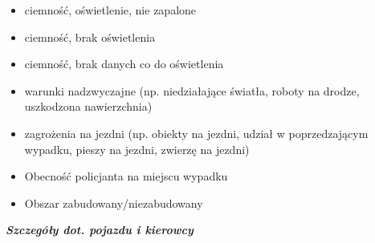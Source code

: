 \begin{itemize}
\item
  ciemność, oświetlenie, nie zapalone\\
\item
  ciemność, brak oświetlenia\\
\item
  ciemność, brak danych co do oświetlenia\\
\item
  warunki nadzwyczajne (np. niedziałające światła, roboty na drodze,
  uszkodzona nawierzchnia)\\
\item
  zagrożenia na jezdni (np. obiekty na jezdni, udział w poprzedzającym
  wypadku, pieszy na jezdni, zwierzę na jezdni)\\
\item
  Obecność policjanta na miejscu wypadku\\
\item
  Obszar zabudowany/niezabudowany
\end{itemize}

\textbf{\emph{Szczegóły dot. pojazdu i kierowcy}}

